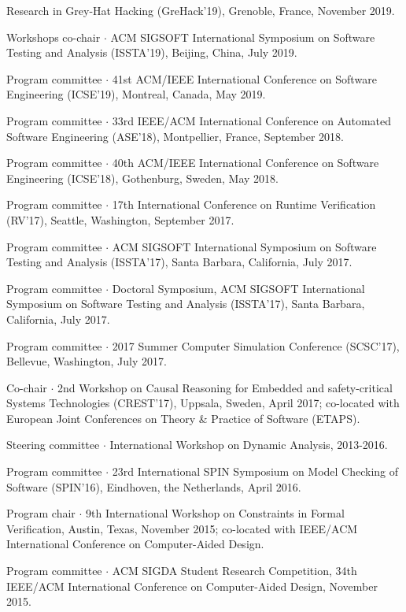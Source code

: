 \documentclass[ComputerScience]{vita}
\begin{document}
\begin{vita}
\begin{Panel and Committee Service}
  Research in Grey-Hat Hacking (GreHack'19), Grenoble, France, 
  November 2019. 
\item Workshops co-chair $\cdot$ ACM SIGSOFT International Symposium on Software Testing and Analysis (ISSTA'19), Beijing, China, July 2019.
\item Program committee $\cdot$ 41st ACM/IEEE International Conference on Software Engineering (ICSE'19), Montreal, Canada, May 2019. 
\item Program committee $\cdot$ 33rd IEEE/ACM International Conference on Automated Software Engineering (ASE'18), Montpellier, France, September 2018.
\item Program committee $\cdot$ 40th ACM/IEEE International Conference on Software Engineering (ICSE'18), Gothenburg, Sweden, May 2018. 
\item Program committee $\cdot$ 17th International Conference on Runtime Verification (RV'17), Seattle, Washington, September 2017.
\item Program committee $\cdot$ ACM SIGSOFT International Symposium on Software Testing and Analysis (ISSTA'17), Santa Barbara, California, July 2017.
\item Program committee $\cdot$ Doctoral Symposium, ACM SIGSOFT International Symposium on Software Testing and Analysis (ISSTA'17), Santa Barbara, California, July 2017.
\item Program committee $\cdot$ 2017 Summer Computer Simulation Conference (SCSC'17), Bellevue, Washington, July 2017.
\item Co-chair $\cdot$  2nd Workshop on Causal Reasoning for Embedded
  and safety-critical Systems Technologies (CREST'17), Uppsala,
  Sweden, April 2017; co-located with European Joint Conferences on
  Theory \& Practice of Software (ETAPS).
\item Steering committee $\cdot$ International Workshop on Dynamic Analysis, 2013-2016.
\item Program committee $\cdot$ 23rd International SPIN Symposium on Model Checking of Software (SPIN'16), Eindhoven, the Netherlands, April 2016.
\item Program chair $\cdot$ 9th International Workshop on Constraints in Formal Verification, Austin, Texas, November 2015; co-located with IEEE/ACM International Conference on Computer-Aided Design.
\item Program committee $\cdot$ ACM SIGDA Student Research Competition, 34th IEEE/ACM International Conference on Computer-Aided Design, November 2015.

\end{Panel and Committee Service}
\end{vita}
\end{document}
